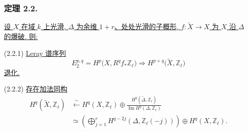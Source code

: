\subsubsection*{定理 2.2.}
\underline{设 $X$ 在域 $k$ 上光滑, $\Delta$ 为余维 $1+r$、处处光滑的子概形, $f:\widetilde X\longrightarrow X$ 为 $X$ 沿 $\Delta$ 的爆破. 则:}

\medskip
\noindent(2.2.1) \underline{Leray 谱序列}
\[
E_2^{p,q}=H^p\bigl(X,R^qf_*\mathbb Z_\ell\bigr)
\Longrightarrow
H^{p+q}\bigl(\widetilde X,\mathbb Z_\ell\bigr)
\]
\underline{退化.}

\medskip
\noindent(2.2.2) \underline{存在加法同构}
\[
\begin{aligned}
H^q(\widetilde X,\mathbb Z_\ell)
&\xleftarrow{\ \sim\ }
H^q(X,\mathbb Z_\ell)\oplus
\frac{H^q(\widetilde\Delta,\mathbb Z_\ell)}
     {\operatorname{Im}H^q(\Delta,\mathbb Z_\ell)}
\\
&\simeq
\left(\bigoplus_{j=1}^{r}
H^{q-2j}(\Delta,\mathbb Z_\ell(-j))\right)
\oplus H^q(X,\mathbb Z_\ell).
\end{aligned}
\]

